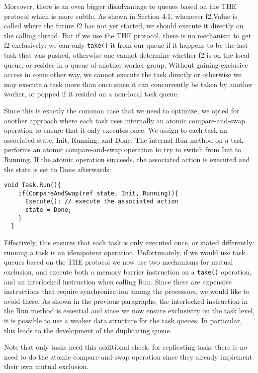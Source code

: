 Moreover, there is an even bigger disadvantage to queues based on the
THE protocol which is more subtle. As shown in Section 4.1, whenever
f2.Value is called where the future f2 has not yet started, we should
execute it directly on the calling thread. But if we use the THE
protocol, there is no mechanism to get f2 exclusively: we can only
\lstinline!take()! it from our queue if it happens to be the last task
that was pushed, otherwise one cannot determine whether f2 is on the
local queue, or resides in a queue of another worker group. Without
gaining exclusive access in some other way, we cannot execute the task
directly or otherwise we may execute a task more than once since it
can concurrently be taken by another worker, or popped if it resided
on a non-local task queue.

Since this is exactly the common case that we need to optimize, we
opted for another approach where each task uses internally an atomic
compare-and-swap operation to ensure that it only executes once. We
assign to each task an associated state, Init, Running, and Done. The
internal Run method on a task performs an atomic compare-and-swap
operation to try to switch from Init to Running. If the atomic
operation succeeds, the associated action is executed and the state is
set to Done afterwards:

\begin{lstlisting}[style=Listing]
  void Task.Run(){
    if(CompareAndSwap(ref state, Init, Running)){
      Execute(); // execute the associated action
      state = Done;
    }
  }
\end{lstlisting}

Effectively, this ensures that each task is only executed once, or
stated differently: running a task is an idempotent
operation. Unfortunately, if we would use task queues based on the THE
protocol we now use two mechanisms for mutual exclusion, and execute
both a memory barrier instruction on a \lstinline!take()! operation,
and an interlocked instruction when calling Run. Since these are
expensive instructions that require synchronization among the
processors, we would like to avoid these. As shown in the previous
paragraphs, the interlocked instruction in the Run method is essential
and since we now ensure exclusivity on the task level, it is possible
to use a weaker data structure for the task queues. In particular,
this leads to the development of the duplicating queue.

Note that only tasks need this additional check; for replicating tasks
there is no need to do the atomic compare-and-swap operation since
they already implement their own mutual exclusion.

